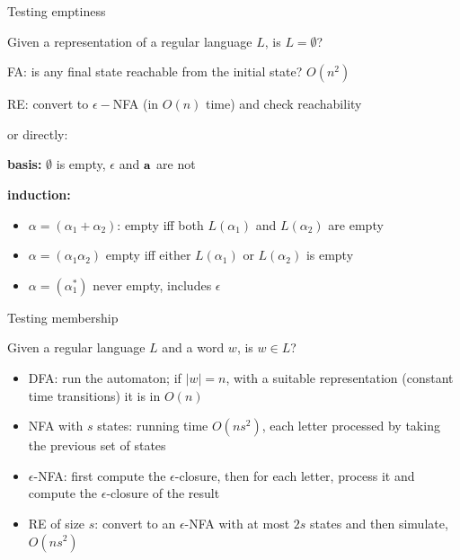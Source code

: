 \documentclass[handout]{beamer}
\begin{document}
\begin{frame}{Testing emptiness}

    Given a representation of a regular language $L$, is $L=\emptyset$?

    \alert{FA:} is any final state reachable from the initial state? $O(n^2)$

    \alert{RE:} convert to $\epsilon-$NFA (in $O(n)$ time) and check reachability
    
    or directly: 
    
    \textbf{basis:} $\emptyset$ is empty, $\epsilon$ and $\bf{a}$ are not
    
    \textbf{induction:}
    \begin{itemize}
        \item $\alpha=(\alpha_1+\alpha_2)$: empty iff both $L(\alpha_1)$ and $L(\alpha_2)$ are empty
        \item $\alpha=(\alpha_1\alpha_2)$ empty iff either $L(\alpha_1)$ or $L(\alpha_2)$ is empty
        \item $\alpha=(\alpha_1^*)$ never empty, includes $\epsilon$            
    \end{itemize}

\end{frame}


\begin{frame}{Testing membership}

    Given a regular language $L$ and a word $w$, is $w\in L$?
    \begin{itemize}
        \item \alert{DFA:} run the automaton; if $|w|=n$, with a suitable representation (constant time transitions) it is in $O(n)$
        \item \alert{NFA} with $s$ states: running time $O(ns^2)$, each letter processed by taking the previous set of states
        \item \alert{$\epsilon$-NFA}: first compute the $\epsilon$-closure, then for each letter, process it and compute the $\epsilon$-closure of the result
        \item \alert{RE} of size $s$: convert to an $\epsilon$-NFA with at most $2s$ states and then simulate, $O(ns^2)$
    \end{itemize}

\end{frame}
\end{document}
